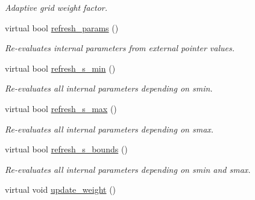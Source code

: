 \begin{DoxyCompactItemize}
\begin{DoxyCompactList}\small\item\em Adaptive grid weight factor. \end{DoxyCompactList}\item 
virtual bool \hyperlink{a00482_af6cb5ca85a519544d1e2c2cdd86e3590}{refresh\-\_\-params} ()
\begin{DoxyCompactList}\small\item\em Re-\/evaluates internal parameters from external pointer values. \end{DoxyCompactList}\item 
virtual bool \hyperlink{a00482_a8abba1aaf5b92db4408c3d73d288e3b2}{refresh\-\_\-s\-\_\-min} ()
\begin{DoxyCompactList}\small\item\em Re-\/evaluates all internal parameters depending on smin. \end{DoxyCompactList}\item 
virtual bool \hyperlink{a00482_a2da522fd997d5c1f7da805c926b661d8}{refresh\-\_\-s\-\_\-max} ()
\begin{DoxyCompactList}\small\item\em Re-\/evaluates all internal parameters depending on smax. \end{DoxyCompactList}\item 
virtual bool \hyperlink{a00482_a1eadd2859e41a90ee631364801aeb04b}{refresh\-\_\-s\-\_\-bounds} ()
\begin{DoxyCompactList}\small\item\em Re-\/evaluates all internal parameters depending on smin and smax. \end{DoxyCompactList}\item 
\hypertarget{a00482_a4a794c408feeb519f345e702d986952b}{virtual void \hyperlink{a00482_a4a794c408feeb519f345e702d986952b}{update\-\_\-weight} ()}\label{a00482_a4a794c408feeb519f345e702d986952b}


\end{DoxyCompactItemize}
